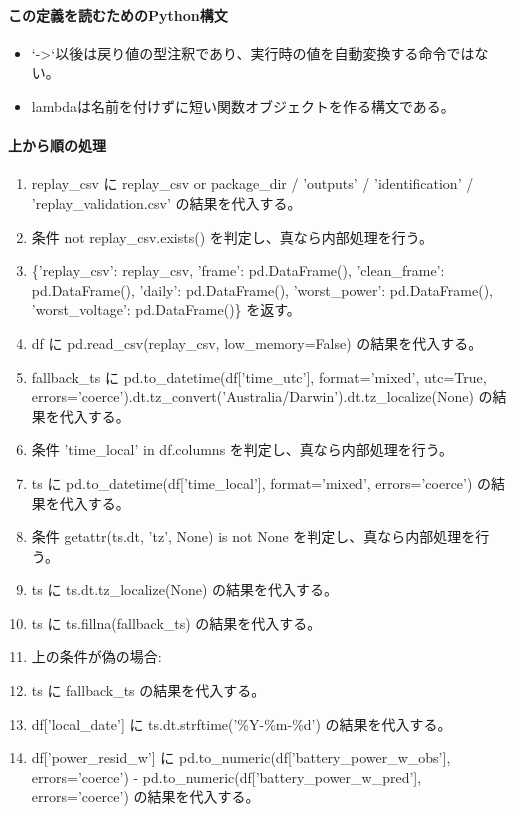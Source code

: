 \documentclass[a4paper,11pt]{article}
\begin{document}
            \paragraph{この定義を読むためのPython構文}
            \begin{itemize}[leftmargin=1.6em]
            \item `->`以後は戻り値の型注釈であり、実行時の値を自動変換する命令ではない。
\item lambdaは名前を付けずに短い関数オブジェクトを作る構文である。
            \end{itemize}
            \paragraph{上から順の処理}
            \begin{enumerate}[leftmargin=1.8em]
            \item replay\_csv に replay\_csv or package\_dir / 'outputs' / 'identification' / 'replay\_validation.csv' の結果を代入する。
\item 条件 not replay\_csv.exists() を判定し、真なら内部処理を行う。
\item   \{'replay\_csv': replay\_csv, 'frame': pd.DataFrame(), 'clean\_frame': pd.DataFrame(), 'daily': pd.DataFrame(), 'worst\_power': pd.DataFrame(), 'worst\_voltage': pd.DataFrame()\} を返す。
\item df に pd.read\_csv(replay\_csv, low\_memory=False) の結果を代入する。
\item fallback\_ts に pd.to\_datetime(df['time\_utc'], format='mixed', utc=True, errors='coerce').dt.tz\_convert('Australia/Darwin').dt.tz\_localize(None) の結果を代入する。
\item 条件 'time\_local' in df.columns を判定し、真なら内部処理を行う。
\item   ts に pd.to\_datetime(df['time\_local'], format='mixed', errors='coerce') の結果を代入する。
\item   条件 getattr(ts.dt, 'tz', None) is not None を判定し、真なら内部処理を行う。
\item     ts に ts.dt.tz\_localize(None) の結果を代入する。
\item   ts に ts.fillna(fallback\_ts) の結果を代入する。
\item   上の条件が偽の場合:
\item   ts に fallback\_ts の結果を代入する。
\item df['local\_date'] に ts.dt.strftime('\%Y-\%m-\%d') の結果を代入する。
\item df['power\_resid\_w'] に pd.to\_numeric(df['battery\_power\_w\_obs'], errors='coerce') - pd.to\_numeric(df['battery\_power\_w\_pred'], errors='coerce') の結果を代入する。

\end{enumerate}
\end{document}
